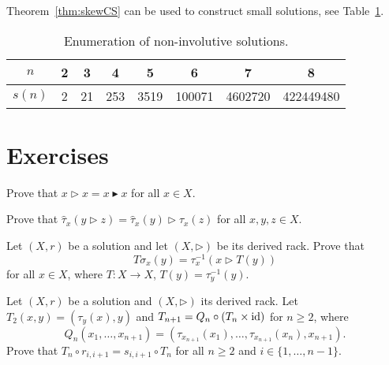 Theorem~\ref{thm:skewCS} can be used to construct small solutions, see Table~\ref{tab:non_involutive}.

\begin{table}[H]
\centering
\caption{Enumeration of non-involutive solutions.}
\begin{tabular}{|c|ccccccc|}
\hline
$n$ & 2 & 3 & 4 & 5 & 6 & 7 & 8\tabularnewline
\hline
$s(n)$ & 2 & 21 & 253 & 3519 & 100071 & 4602720 & 422449480\tabularnewline
\hline
\end{tabular}
\label{tab:non_involutive}
\end{table}

\section*{Exercises}

\begin{prob}
    \label{prob:xx}
    Prove that $x\triangleright x=x\blacktriangleright x$ for all $x\in X$. 
\end{prob}

\begin{prob}
    \label{prob:tau_hat}
    Prove that $\widehat{\tau}_x(y\triangleright z)=\widehat{\tau}_x(y)\triangleright \widehat{\tau}_x(z)$ for all $x,y,z\in X$. 
\end{prob}

\begin{prob}
    \label{prob:variationT}
    Let $(X,r)$ be a solution and let $(X,\triangleright)$ be its derived rack. 
    Prove that 
    \[
    T\sigma_x(y)=\tau_x^{-1}(x\triangleright T(y))
    \]
    for all $x\in X$, where $T\colon X\to X$, $T(y)=\tau_y^{-1}(y)$. 
\end{prob}

\begin{prob}
\label{prob:guitar}
Let $(X,r)$ be a solution and $(X,\triangleright)$ its derived rack. Let $T_2(x,y)=(\tau_y(x),y)$ and
$T_{n+1}=Q_n\circ (T_n\times\operatorname{id})$ for $n\geq2$, where 
\[
Q_n(x_1,\dots,x_{n+1})=(\tau_{x_{n+1}}(x_1),\dots,\tau_{x_{n+1}}(x_n),x_{n+1}).
\]
Prove that $T_n\circ r_{i,i+1}=s_{i,i+1}\circ T_n$ for all $n\geq2$ and $i\in\{1,\dots,n-1\}$. 
\end{prob}


